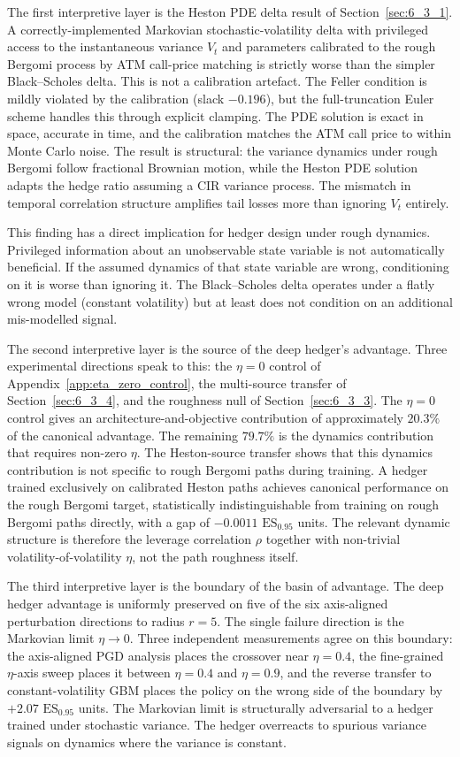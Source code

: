 \documentclass[12pt,a4paper]{article}
\theoremstyle{definition}
\theoremstyle{plain}
\theoremstyle{remark}
\theoremstyle{plain}
\begin{document}
The first interpretive layer is the Heston PDE delta result of
Section~\ref{sec:6_3_1}. A correctly-implemented Markovian
stochastic-volatility delta with privileged access to the
instantaneous variance $V_t$ and parameters calibrated to the rough
Bergomi process by ATM call-price matching is strictly worse than the
simpler Black--Scholes delta. This is not a calibration artefact. The
Feller condition is mildly violated by the calibration (slack
$-0.196$), but the full-truncation Euler scheme handles this through
explicit clamping. The PDE solution is exact in space, accurate in
time, and the calibration matches the ATM call price to within Monte
Carlo noise. The result is structural: the variance dynamics under
rough Bergomi follow fractional Brownian motion, while the Heston PDE
solution adapts the hedge ratio assuming a CIR variance process. The
mismatch in temporal correlation structure amplifies tail losses
more than ignoring $V_t$ entirely.

This finding has a direct implication for hedger design under rough
dynamics. Privileged information about an unobservable state variable
is not automatically beneficial. If the assumed dynamics of that
state variable are wrong, conditioning on it is worse than ignoring
it. The Black--Scholes delta operates under a flatly wrong model
(constant volatility) but at least does not condition on an
additional mis-modelled signal.

The second interpretive layer is the source of the deep hedger's
advantage. Three experimental directions speak to this: the $\eta = 0$
control of Appendix~\ref{app:eta_zero_control}, the multi-source
transfer of Section~\ref{sec:6_3_4}, and the roughness null of
Section~\ref{sec:6_3_3}. The $\eta = 0$ control gives an
architecture-and-objective contribution of approximately $20.3\%$ of
the canonical advantage. The remaining $79.7\%$ is the dynamics
contribution that requires non-zero $\eta$. The Heston-source
transfer shows that this dynamics contribution is not specific to
rough Bergomi paths during training. A hedger trained exclusively on
calibrated Heston paths achieves canonical performance on the rough
Bergomi target, statistically indistinguishable from training on
rough Bergomi paths directly, with a gap of $-0.0011$
$\mathrm{ES}_{0.95}$ units. The relevant dynamic structure is
therefore the leverage correlation $\rho$ together with non-trivial
volatility-of-volatility $\eta$, not the path roughness itself.

The third interpretive layer is the boundary of the basin of
advantage. The deep hedger advantage is uniformly preserved on five
of the six axis-aligned perturbation directions to radius $r = 5$.
The single failure direction is the Markovian limit $\eta \to 0$.
Three independent measurements agree on this boundary: the
axis-aligned PGD analysis places the crossover near $\eta = 0.4$,
the fine-grained $\eta$-axis sweep places it between $\eta = 0.4$
and $\eta = 0.9$, and the reverse transfer to constant-volatility
GBM places the policy on the wrong side of the boundary by $+2.07$
$\mathrm{ES}_{0.95}$ units. The Markovian limit is structurally
adversarial to a hedger trained under stochastic variance. The
hedger overreacts to spurious variance signals on dynamics where the
variance is constant.
\end{document}
